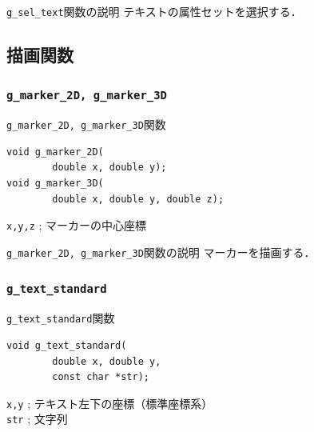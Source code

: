 \documentclass[platex,a4paper,12pt]{jsarticle}%
\begin{document}
\begin{itembox}[l]{\texttt{g\_sel\_text}関数の説明}
テキストの属性セットを選択する．
\end{itembox}




\clearpage
\subsection{描画関数}
\subsubsection{\texttt{g\_marker\_2D, g\_marker\_3D}}

\begin{itembox}[l]{\texttt{g\_marker\_2D, g\_marker\_3D}関数}
\begin{verbatim}
void g_marker_2D(
        double x, double y);
void g_marker_3D(
        double x, double y, double z);	
\end{verbatim}
\verb|x,y,z| ; マーカーの中心座標
\end{itembox}

\begin{itembox}[l]{\texttt{g\_marker\_2D, g\_marker\_3D}関数の説明}
マーカーを描画する．
\end{itembox}

\begin{figure}[htb]
\end{figure}




\clearpage
\subsubsection{\texttt{g\_text\_standard}}

\begin{itembox}[l]{\texttt{g\_text\_standard}関数}
\begin{verbatim}
void g_text_standard(
        double x, double y,
        const char *str);
\end{verbatim}
\verb|x,y| ; テキスト左下の座標（標準座標系）\\
\verb|str| ; 文字列
\end{itembox}
\end{document}
